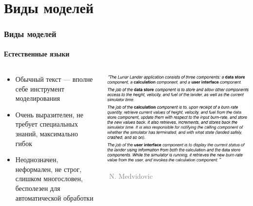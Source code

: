 \documentclass[xetex,mathserif,serif]{beamer}
\newcommand{\attribution}[1] {
	\vspace{-5mm}\begin{flushright}\begin{scriptsize}\textcolor{gray}{\textcopyright\, #1}\end{scriptsize}\end{flushright}
}
\begin{document}
	\section{Виды моделей}

	\begin{frame}
		\frametitle{Виды моделей}
		\framesubtitle{Естественные языки}
		\begin{columns}
			\begin{column}{0.5\textwidth}
				\begin{itemize}
					\item Обычный текст --- вполне себе инструмент моделирования
					\item Очень выразителен, не требует специальных знаний, максимально гибок
					\item Неоднозначен, неформален, не строг, слишком многословен, бесполезен для автоматической обработки
				\end{itemize}
			\end{column}
			\begin{column}{0.5\textwidth}
				\begin{center}
					\includegraphics[width=\textwidth]{naturalLanguage.png}
					\attribution{N. Medvidovic}
				\end{center}
			\end{column}
		\end{columns}
	\end{frame}
\end{document}
